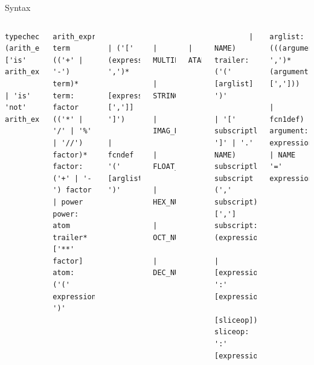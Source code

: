 \documentclass{beamer}
\begin{document}
\begin{frame}[fragile]{Syntax}
\begin{columns}[t]
\tiny{}
\begin{verbatim}
typecheck: (arith_expr ['is' arith_expr
             | 'is' 'not' arith_expr])
\end{verbatim}
\vspace{-0.8 cm}
\begin{verbatim}
arith_expr: term (('+' | '-') term)*
term: factor (('*' | '/' | '%' | '//') factor)*
factor: ('+' | '-') factor | power
power: atom trailer* ['**' factor]
atom: ('(' expression ')'
\end{verbatim}
\vspace{-0.8 cm}
\begin{verbatim}
        | ('[' (expression ',')*
             [expression [',']] ']')
        | fcndef '(' [arglist] ')'
\end{verbatim}
\vspace{-0.8 cm}
\begin{verbatim}
        | MULTILINESTRING
        | STRING
        | IMAG_NUMBER
        | FLOAT_NUMBER
        | HEX_NUMBER
        | OCT_NUMBER
        | DEC_NUMBER
\end{verbatim}
\vspace{-0.8 cm}
\begin{verbatim}
        | ATARG
\end{verbatim}
\vspace{-0.8 cm}
\begin{verbatim}
        | NAME)
trailer: ('(' [arglist] ')'
           | '[' subscriptlist ']' | '.' NAME)
subscriptlist: subscript (',' subscript)* [',']
subscript: (expression
           | [expression] ':' [expression]
             [sliceop])
sliceop: ':' [expression]
\end{verbatim}
\vspace{-0.8 cm}
\begin{verbatim}
arglist: (((argument ',')* (argument [',']))
           | fcn1def)
argument: expression | NAME '=' expression
\end{verbatim}
\end{columns}
\end{frame}
\end{document}
